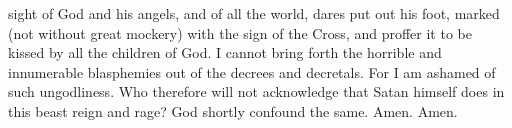 sight of God and his angels, and of all the world, dares put out his foot, marked (not without great mockery) with the sign of the Cross, and proffer it to be kissed by all the children of God. I cannot bring forth the horrible and innumerable blasphemies out of the decrees and decretals. For I am ashamed of such ungodliness. Who therefore will not acknowledge that Satan himself does in this beast reign and rage? God shortly confound the same. Amen. Amen.
